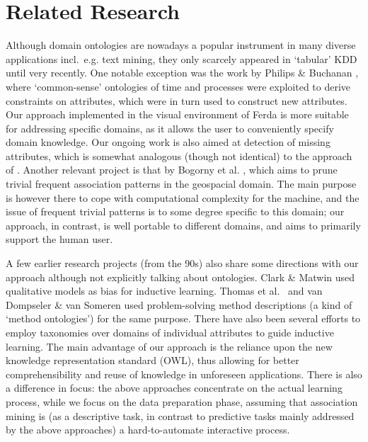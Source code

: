 \section{Related Research} \label{Related}

Although domain ontologies are nowadays a popular instrument in many diverse applications incl.~e.g. text mining, they only scarcely appeared in `tabular' KDD until very recently.
One notable exception was the work by Philips \& Buchanan \cite{Philips}, where `common-sense' ontologies of time and processes were exploited to
derive constraints on attributes, which were in turn used to construct new attributes.
Our approach implemented in the visual environment of Ferda is more suitable for addressing specific domains, as it allows the user to conveniently specify domain knowledge.
Our ongoing work is also aimed at detection of missing attributes, which is somewhat analogous (though not identical) to the approach of \cite{Philips}.
Another relevant project is that by Bogorny et al. \cite{Bogorny}, which aims to prune trivial frequent association patterns in the geospacial domain. The main purpose is however there to cope with computational complexity for the machine, and the issue of frequent trivial patterns is to some degree specific to this domain; our approach, in contrast, is well portable to different domains, and aims to primarily support the human user.

A few earlier research projects (from the 90s) also share some directions with our approach although not explicitly talking about ontologies.
Clark \& Matwin \cite{Clark} used qualitative models as bias for inductive learning.
Thomas et al.~\cite{Thomas} and van Dompseler \& van Someren \cite{Someren} used problem-solving method descriptions (a kind of `method ontologies') for the same purpose.
There have also been several efforts to employ taxonomies over domains of individual attributes \cite{Hussein,Aronis,Nunez,Svatek} to guide inductive
learning.
The main advantage of our approach is the reliance upon the new knowledge representation standard (OWL), thus allowing for better comprehensibility and reuse of knowledge in unforeseen applications.
There is also a difference in focus: the above approaches concentrate on the actual learning process, while we focus on the data preparation phase, assuming that association mining is (as a descriptive task, in contrast to predictive tasks mainly addressed by the above approaches) a hard-to-automate interactive process.

